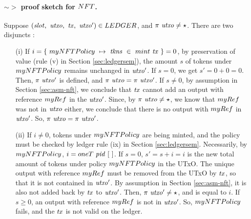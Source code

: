 \paragraph{$\sim >$ proof sketch for $\fun{NFT}$. }
\label{pf:nft}
Suppose $(\var{slot},~\var{utxo},~\var{tx},~\var{utxo'}) \in \LEDGER$, and
$\pi~\mathit{utxo} \neq \star$. There are two disjuncts :
\begin{itemize}
  \item[(i)] If $i = \{~\fun{myNFTPolicy}~\mapsto~\var{tkns}~\in~ \fun{mint}~\var{tx}~\} = 0$, by preservation of value (rule (v) in Section
  \ref{sec:ledgersem}), the amount $s$ of tokens under $\fun{myNFTPolicy}$ remains unchanged
   in $\mathit{utxo'}$. If $s = 0$, we get $s' = 0 + 0 = 0$. Then, $\pi~\mathit{utxo'}$ is defined, and
   $\pi~\mathit{utxo} = \pi~\mathit{utxo'}$. If $s \neq 0$, by assumption in
   Section \ref{sec:asm-nft}, we conclude that $\mathit{tx}$ cannot add an output
   with reference $\fun{myRef}$ in the $\mathit{utxo'}$. Since,
  by $\pi~\mathit{utxo} \neq \star$, we know that $\fun{myRef}$ was not in
  $\mathit{utxo}$ either, we conclude that there is no output with $\fun{myRef}$ in $\mathit{utxo'}$.
  So, $\pi~\mathit{utxo} = \pi~\mathit{utxo'}$.

  \item[(ii)] If $i \neq 0$, tokens under $\fun{myNFTPolicy}$ are being minted,
  and the policy must be checked by ledger rule (ix) in Section \ref{sec:ledgersem}.
  Necessarily, by $\fun{myNFTPolicy}$, $i = \fun{oneT}~\var{pid}~[~]$.
  If $s = 0$, $s' = s + i = i$ is the new total amount of tokens under policy
  $\fun{myNFTPolicy}$ in the UTxO. The unique output with reference $\fun{myRef}$
  must be removed from the UTxO by $\mathit{tx}$, so that it is not contained in
  $\mathit{utxo'}$. By assumption in
  Section \ref{sec:asm-nft}, it is also not added back by $\mathit{tx}$ to $\mathit{utxo'}$.
  Then, $\pi~\mathit{utxo'} \neq \star$, and is equal to $i$.
  If $s \geq 0$, an output with reference $\fun{myRef}$ is not in $\mathit{utxo'}$.
  So, $\fun{myNFTPolicy}$ fails, and the $\mathit{tx}$ is not valid on the ledger.
\end{itemize}

